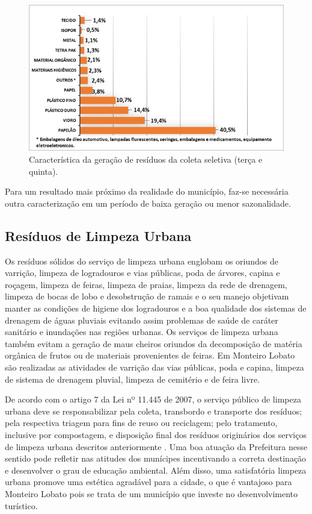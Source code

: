 	\begin{figure}
		\centering
		\includegraphics[width=0.75\linewidth]{produtos/prodtres/image050}
		\caption{Característica da geração de resíduos da coleta seletiva (terça e quinta).}
		\label{fig:image050}
	\end{figure}

	
	Para um resultado mais próximo da realidade do município, faz-se necessária outra caracterização em um período de baixa geração ou menor sazonalidade.
	
	\subsection{Resíduos de Limpeza Urbana}
	
	Os resíduos sólidos do serviço de limpeza urbana englobam os oriundos de varrição, limpeza de logradouros e vias públicas, poda de árvores, capina e roçagem, limpeza de feiras, limpeza de praias, limpeza da rede de drenagem, limpeza de bocas de lobo e desobstrução de ramais \cite{brasil:12305, brasil:11445, ibam:2001} e o seu manejo objetivam manter as condições de higiene dos logradouros e a boa qualidade dos sistemas de drenagem de águas pluviais evitando assim problemas de saúde de caráter sanitário e inundações nas regiões urbanas. Os serviços de limpeza urbana também evitam a geração de maus cheiros oriundos da decomposição de matéria orgânica de frutos ou de materiais provenientes de feiras. Em Monteiro Lobato são realizadas as atividades de varrição das vias públicas, poda e capina, limpeza de sistema de drenagem pluvial, limpeza de cemitério e de feira livre.
	
	De acordo com o artigo 7 da Lei nº 11.445 de 2007, o serviço público de limpeza urbana deve se responsabilizar pela coleta, transbordo e transporte dos resíduos; pela respectiva triagem para fins de reuso ou reciclagem; pelo tratamento, inclusive por compostagem, e disposição final dos resíduos originários dos serviços de limpeza urbana descritos anteriormente \cite{brasil:11445}. Uma boa atuação da Prefeitura nesse sentido pode refletir nas atitudes dos munícipes incentivando a correta destinação e desenvolver o grau de educação ambiental. Além disso, uma satisfatória limpeza urbana promove uma estética agradável para a cidade, o que é vantajoso para Monteiro Lobato pois se trata de um município que investe no desenvolvimento turístico.
	 
